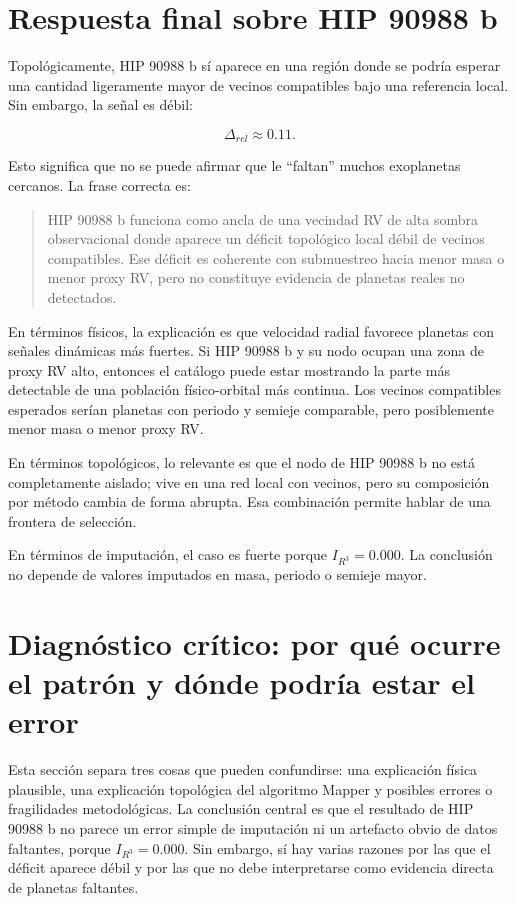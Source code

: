 \documentclass[11pt]{article}
\begin{document}
\section{Respuesta final sobre HIP 90988 b}

Topológicamente, HIP 90988 b sí aparece en una región donde se podría esperar una cantidad ligeramente mayor de vecinos compatibles bajo una referencia local. Sin embargo, la señal es débil:

\[
\Delta_{rel}\approx 0.11.
\]

Esto significa que no se puede afirmar que le ``faltan'' muchos exoplanetas cercanos. La frase correcta es:

\begin{quote}
HIP 90988 b funciona como ancla de una vecindad RV de alta sombra observacional donde aparece un déficit topológico local débil de vecinos compatibles. Ese déficit es coherente con submuestreo hacia menor masa o menor proxy RV, pero no constituye evidencia de planetas reales no detectados.
\end{quote}

En términos físicos, la explicación es que velocidad radial favorece planetas con señales dinámicas más fuertes. Si HIP 90988 b y su nodo ocupan una zona de proxy RV alto, entonces el catálogo puede estar mostrando la parte más detectable de una población físico-orbital más continua. Los vecinos compatibles esperados serían planetas con periodo y semieje comparable, pero posiblemente menor masa o menor proxy RV.

En términos topológicos, lo relevante es que el nodo de HIP 90988 b no está completamente aislado; vive en una red local con vecinos, pero su composición por método cambia de forma abrupta. Esa combinación permite hablar de una frontera de selección.

En términos de imputación, el caso es fuerte porque $I_{R^3}=0.000$. La conclusión no depende de valores imputados en masa, periodo o semieje mayor.


\section{Diagnóstico crítico: por qué ocurre el patrón y dónde podría estar el error}

Esta sección separa tres cosas que pueden confundirse: una explicación física plausible, una explicación topológica del algoritmo Mapper y posibles errores o fragilidades metodológicas. La conclusión central es que el resultado de HIP 90988 b no parece un error simple de imputación ni un artefacto obvio de datos faltantes, porque $I_{R^3}=0.000$. Sin embargo, sí hay varias razones por las que el déficit aparece débil y por las que no debe interpretarse como evidencia directa de planetas faltantes.
\end{document}
